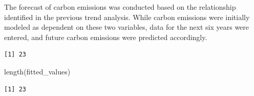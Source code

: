 \documentclass[
  letterpaper,
  DIV=11,
  numbers=noendperiod]{scrartcl}
\newenvironment{Shaded}{\begin{snugshade}}{\end{snugshade}}
\newcommand{\AttributeTok}[1]{\textcolor[rgb]{0.40,0.45,0.13}{#1}}
\newcommand{\FunctionTok}[1]{\textcolor[rgb]{0.28,0.35,0.67}{#1}}
\newcommand{\NormalTok}[1]{\textcolor[rgb]{0.00,0.23,0.31}{#1}}
\newcommand{\OtherTok}[1]{\textcolor[rgb]{0.00,0.23,0.31}{#1}}
\newcommand{\SpecialCharTok}[1]{\textcolor[rgb]{0.37,0.37,0.37}{#1}}
\newcommand{\StringTok}[1]{\textcolor[rgb]{0.13,0.47,0.30}{#1}}
\begin{document}
The forecast of carbon emissions was conducted based on the relationship
identified in the previous trend analysis. While carbon emissions were
initially modeled as dependent on these two variables, data for the next
six years were entered, and future carbon emissions were predicted
accordingly.

\begin{Shaded}
\end{Shaded}

\begin{verbatim}
[1] 23
\end{verbatim}

\begin{Shaded}
\begin{Highlighting}[]
\FunctionTok{length}\NormalTok{(fitted\_values)}
\end{Highlighting}
\end{Shaded}

\begin{verbatim}
[1] 23
\end{verbatim}
\end{document}
